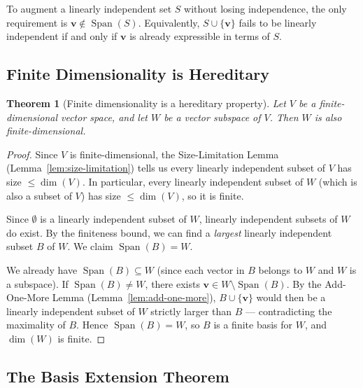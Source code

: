 \documentclass[11pt, a4paper, notitlepage]{report}
\newtheorem{theorem}{Theorem}[section]
\theoremstyle{definition}
\theoremstyle{remark}
\begin{document}
\begin{keyresult}[title={Key Result: The Add-One-More Lemma}]
To augment a linearly independent set $S$ without losing independence, the only requirement is $\mathbf{v}\notin\operatorname{Span}(S)$. Equivalently, $S\cup\{\mathbf{v}\}$ fails to be linearly independent if and only if $\mathbf{v}$ is already expressible in terms of $S$.
\end{keyresult}

\subsection{Finite Dimensionality is Hereditary}

\begin{theorem}[Finite dimensionality is a hereditary property]\label{thm:hereditary-dim}
Let $V$ be a finite-dimensional vector space, and let $W$ be a vector subspace of $V$. Then $W$ is also finite-dimensional.
\end{theorem}

\begin{proof}
Since $V$ is finite-dimensional, the Size-Limitation Lemma (Lemma~\ref{lem:size-limitation}) tells us every linearly independent subset of $V$ has size $\le\dim(V)$. In particular, every linearly independent subset of $W$ (which is also a subset of $V$) has size $\le\dim(V)$, so it is finite.

Since $\emptyset$ is a linearly independent subset of $W$, linearly independent subsets of $W$ do exist. By the finiteness bound, we can find a \emph{largest} linearly independent subset $B$ of $W$. We claim $\operatorname{Span}(B) = W$.

We already have $\operatorname{Span}(B)\subseteq W$ (since each vector in $B$ belongs to $W$ and $W$ is a subspace). If $\operatorname{Span}(B)\neq W$, there exists $\mathbf{v}\in W\setminus\operatorname{Span}(B)$. By the Add-One-More Lemma (Lemma~\ref{lem:add-one-more}), $B\cup\{\mathbf{v}\}$ would then be a linearly independent subset of $W$ strictly larger than $B$ — contradicting the maximality of $B$. Hence $\operatorname{Span}(B) = W$, so $B$ is a finite basis for $W$, and $\dim(W)$ is finite.
\end{proof}

\subsection{The Basis Extension Theorem}
\end{document}
